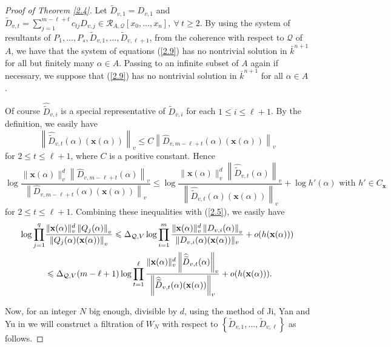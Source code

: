 \documentclass[12pt,leqno]{amsart}
\numberwithin{equation}{section}
\begin{document}
\begin{proof}[Proof of Theorem \ref{2.4}]
Let $\widetilde{D}_{v,1}={D}_{v,1}$ and $\widetilde{D}_{v,t}=\sum_{j=1}^{m-\ell+t} c_{tj}D_{v,j}\in  \mathcal{R}_{A, \mathcal{Q}}\left[x_0, \ldots, x_n\right],\ \forall\ t\geq 2.$ By using the system of resultants of $P_1,\ldots,P_s,\widetilde{D}_{v,1},\ldots,\widetilde{D}_{v,\ell+1}$, from the coherence with respect to $\mathcal Q$ of $A$, we have that the system of equations (\ref{2.9}) has no nontrivial solution in $\bar{k}^{n+1}$ for all but finitely many $\alpha\in A$. Passing to an infinite subset of $A$ again if necessary, we suppose that (\ref{2.9}) has no nontrivial solution in $\bar{k}^{n+1}$ for all $\alpha\in A$.

Of course $\widehat{\widetilde{D}}_{v,i}$ is a special representative of $\widetilde{D}_{v,i}$ for each $1\leqslant i\leqslant \ell+1$.
By the definition, we easily have
$$\left\|\widehat{\widetilde{D}}_{v,t}(\alpha)(\mathbf{x}(\alpha))\right\|_{v}\leqslant C\left\|\widehat{D}_{v,m-\ell+t}(\alpha)(\mathbf{x}(\alpha))\right\|_{v}$$
for $2\leqslant t \leqslant \ell+1$, where $C$ is a positive constant. Hence
$$\log \frac{\|\mathbf{x}(\alpha)\|_{v}^{d}\left\|\widehat{D}_{v,m-\ell+t}(\alpha)\right\|_{v}}{\left\|\widehat{D}_{v,m-\ell+t}(\alpha)(\mathbf{x}(\alpha))\right\|_{v}} \leqslant \log \frac{\|\mathbf{x}(\alpha)\|_{v}^{d}\left\|\widehat{\widetilde{D}}_{v,t}(\alpha)\right\|_{v}}{\left\|\widehat{\widetilde{D}}_{v,t}(\alpha)(\mathbf{x}(\alpha))\right\|_{v}}+\log h'(\alpha)\text { with } h'\in C_{\mathbf{x}}$$
for $2\leqslant t \leqslant \ell+1$. Combining these inequalities with (\ref{2.5}), we easily have
\begin{align}\label{2.10}
\begin{split}
\log \prod_{j=1}^{q}&\frac{\|\mathbf{x}(\alpha)\|_{v}^{d}\left\|Q_{j}(\alpha)\right\|_{v}}{\left\|Q_{j}(\alpha)(\mathbf{x}(\alpha))\right\|_{v}}
\leqslant \Delta_{\mathcal Q,V}\log \prod_{i=1}^{m}\dfrac{\|{\bf x}(\alpha)\|_v^{d}\left\|D_{v,i}(\alpha)\right\|_{v}}{\|D_{v,i}(\alpha)({\bf x}(\alpha))\|_v}+o(h({\bf x}(\alpha)))\\
&\leqslant \Delta_{\mathcal Q,V}(m-\ell+1) \log \prod_{t=1}^{\ell} \frac{\|\mathbf{x}(\alpha)\|_{v}^{d}\left\|\widehat{\widetilde{D}}_{v,t}(\alpha)\right\|_{v}}{\left\|\widehat{\widetilde{D}}_{v,t}(\alpha)(\mathbf{x}(\alpha))\right\|_{v}}+o(h({\bf x}(\alpha))).
\end{split}
\end{align}

Now, for an integer $N$ big enough, divisible by $d$, using the method of Ji, Yan and Yu in \cite{JYY} we will construct a filtration of $W_N$ with respect to $\left\{\widetilde{D}_{v,1}, \ldots, \widetilde{D}_{v,\ell}\right\}$ as follows. 


\end{proof}
\end{document}
